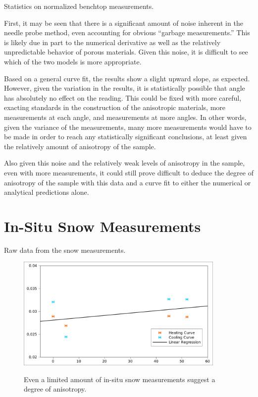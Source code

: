 \begin{table}[h]
\centering

\label{tab:pow-stats}
\caption{Statistics on normalized benchtop measurements.}
\end{table}


First, it may be seen that there is a significant amount of noise inherent in
the needle probe method, even accounting for obvious ``garbage measurements.''
This is likely due in part to the numerical derivative as well as the relatively
unpredictable behavior of porous materials. Given
this noise, it is difficult to see which of the two models is more appropriate.

Based on a general curve fit, the results show a slight upward slope, as
expected. However, given the variation in the results, it is statistically
possible that angle has absolutely no effect on the reading. This could be fixed
with more careful, exacting standards in the construction of the anisotropic
materials, more measurements at each angle, and measurements at more angles.
In other words, given the variance of the measurements, many more measurements
would have to be made in order to reach any statistically significant
conclusions, at least given the relatively amount of anisotropy of the sample.

Also given this noise and the relatively weak levels of anisotropy in the
sample, even with more measurements, it could still prove difficult to deduce
the degree of anisotropy of the sample with this data and a curve fit to either
the numerical or analytical predictions alone.


\section{In-Situ Snow Measurements}

\begin{table}[h]
\centering

\label{tab:snow}
\caption{Raw data from the snow measurements.}
\end{table}



\begin{figure}[h]
\centering
\includegraphics[width=0.9\textwidth]{fig/snow_meas.png}
\label{fig:test_results}
\caption{Even a limited amount of in-situ snow measurements suggest a degree of
anisotropy.}
\end{figure}

